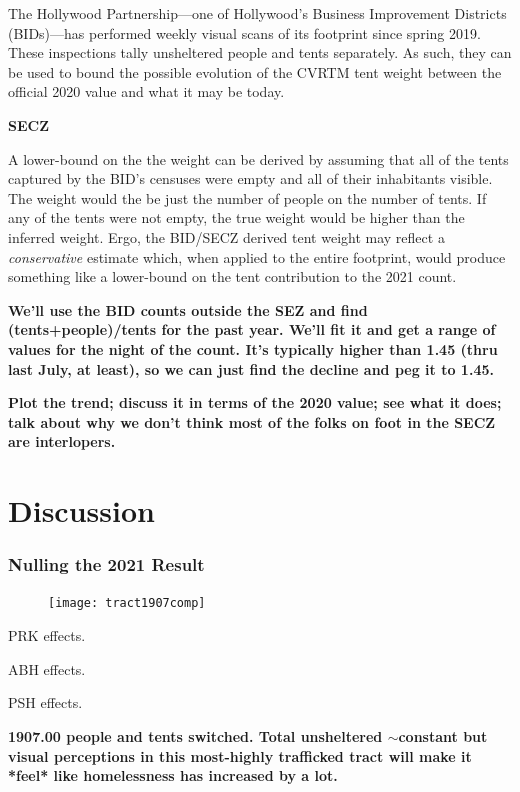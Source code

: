 \documentclass[11pt,twocolumn]{article}
\def\bfr{\bf\color{red}}
\def\Count{count}
\begin{document}
The Hollywood Partnership---one of Hollywood's Business Improvement Districts (BIDs)---has performed
weekly visual scans of its footprint since spring 2019. These inspections tally unsheltered people and 
tents separately. As such, they can be used to bound the possible evolution of the CVRTM tent weight
between the official 2020 value and what it may be today.

{\bfr SECZ}

A lower-bound on the the weight can be derived by assuming that all of the tents captured by the BID's 
censuses were empty and all of their inhabitants visible. The weight would the be just the number of
people on the number of tents. If any of the tents were not empty, the true weight would be higher than
the inferred weight. Ergo, the BID/SECZ derived tent weight may reflect a {\it conservative} estimate 
which, when applied to the entire footprint, would produce something like a lower-bound on the 
tent contribution to the 2021 \Count.

{\bfr We'll use the BID counts outside the SEZ and find (tents+people)/tents for the past year. We'll
fit it and get a range of values for the night of the count. It's typically higher than 1.45 (thru last July,
at least), so we can just find the decline and peg it to 1.45.}

{\bfr Plot the trend; discuss it in terms of the 2020 value; see what it does; talk about why we don't
think most of the folks on foot in the SECZ are interlopers.}

\section{Discussion}
\label{sec:discussion}

\subsubsection{Nulling the 2021 Result}
\label{sec:nullOut}

\begin{figure}[]
	\centering
	\texttt{[image: tract1907comp]}
	\caption{}
\end{figure}

PRK effects.

ABH effects.

PSH effects.

{\bfr 1907.00 people and tents switched. Total unsheltered $\sim$constant but visual perceptions
in this most-highly trafficked tract will make it *feel* like homelessness has increased by a lot.}
\end{document}
